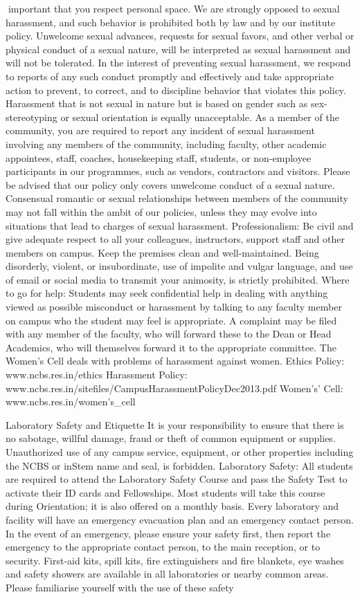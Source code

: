 \documentclass[a4paper,10pt]{article}
\begin{document}
important that you respect personal space. We are strongly opposed to sexual harassment,
and such behavior is prohibited both by law and by our institute policy. Unwelcome sexual
advances, requests for sexual favors, and other verbal or physical conduct of a sexual nature,
will be interpreted as sexual harassment and will not be tolerated. In the interest of
preventing sexual harassment, we respond to reports of any such conduct promptly and
effectively and take appropriate action to prevent, to correct, and to discipline behavior that
violates this policy. Harassment that is not sexual in nature but is based on gender such as
sex-stereotyping or sexual orientation is equally unacceptable. As a member of the
community, you are required to report any incident of sexual harassment involving any
members of the community, including faculty, other academic appointees, staff, coaches,
housekeeping staff, students, or non-employee participants in our programmes, such as
vendors, contractors and visitors. Please be advised that our policy only covers unwelcome
conduct of a sexual nature. Consensual romantic or sexual relationships between members
of the community may not fall within the ambit of our policies, unless they may evolve into
situations that lead to charges of sexual harassment.
Professionalism: Be civil and give adequate respect to all your colleagues, instructors,
support staff and other members on campus. Keep the premises clean and well-maintained.
Being disorderly, violent, or insubordinate, use of impolite and vulgar language, and use of
email or social media to transmit your animosity, is strictly prohibited.
Where to go for help: Students may seek confidential help in dealing with anything viewed
as possible misconduct or harassment by talking to any faculty member on campus who the
student may feel is appropriate. A complaint may be filed with any member of the faculty,
who will forward these to the Dean or Head Academics, who will themselves forward it to
the appropriate committee. The Women’s Cell deals with problems of harassment against
women.
Ethics Policy: www.ncbs.res.in/ethics
Harassment Policy: www.ncbs.res.in/sitefiles/CampusHarassmentPolicyDec2013.pdf
Women’s’ Cell: www.ncbs.res.in/women’s_cell

Laboratory Safety and Etiquette
It is your responsibility to ensure that there is no sabotage, willful damage, fraud or theft of
common equipment or supplies. Unauthorized use of any campus service, equipment, or
other properties including the NCBS or inStem name and seal, is forbidden.
Laboratory Safety: All students are required to attend the Laboratory Safety Course and
pass the Safety Test to activate their ID cards and Fellowships. Most students will take this
course during Orientation; it is also offered on a monthly basis. Every laboratory and facility
will have an emergency evacuation plan and an emergency contact person. In the event of an
emergency, please ensure your safety first, then report the emergency to the appropriate
contact person, to the main reception, or to security. First-aid kits, spill kits, fire
extinguishers and fire blankets, eye washes and safety showers are available in all
laboratories or nearby common areas. Please familiarise yourself with the use of these safety
	
\end{document}
